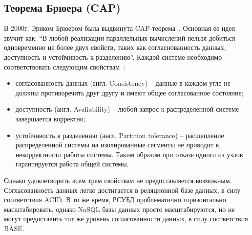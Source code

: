\subsection{Теорема Брюера (CAP)}
В 2000г. Эриком Брюером была выдвинута CAP-теорема~\cite{cap,cap_new}. 
Основная ее идея звучит как: ``В любой реализации параллельных вычислений нельзя добиться одновременно не более двух свойств, таких как согласнованность данных, доступность и устойчивость к разделению''.
Каждой системе необходимо соответствовать следующим свойствам~\cite{morecap}:
\begin{itemize}[label=---]
    \item согласованность данных (англ. Consistency) -- данные в каждом угле не должны противоречить друг другу и имеют общее согласованное состояние;
    \item доступность (англ. Avaliability) -- любой запрос к распределенной системе завершается корректно;
    \item устойчивость к разделению (англ. Partition tolerance) -- расщепление распределенной системы на изолированные сегменты не приводит к некорректности работы системы. Таким образом при отказе одного из узлов гарантируется работа общей системы.
\end{itemize}

Однако удовлетворить всем трем свойствам не предоставляется возможным.
Согласованность данных легко достигается в реляционной базе данных, в силу соответствия ACID.
В то же время, РСУБД проблематично горизонтально масштабировать,
однако NoSQL базы данных просто масштабируются,
но не могут предоставить тот же уровень согласованности данных,
в силу соответствия BASE.

